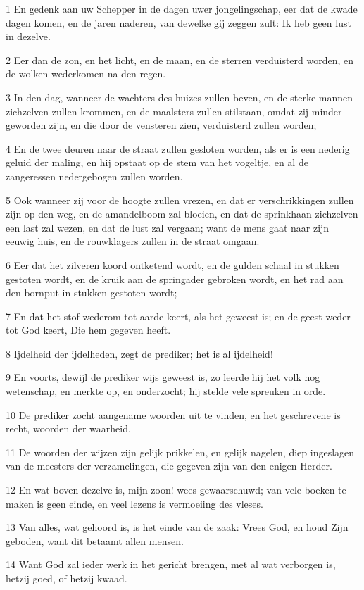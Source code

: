 \par 1 En gedenk aan uw Schepper in de dagen uwer jongelingschap, eer dat de kwade dagen komen, en de jaren naderen, van dewelke gij zeggen zult: Ik heb geen lust in dezelve.
\par 2 Eer dan de zon, en het licht, en de maan, en de sterren verduisterd worden, en de wolken wederkomen na den regen.
\par 3 In den dag, wanneer de wachters des huizes zullen beven, en de sterke mannen zichzelven zullen krommen, en de maalsters zullen stilstaan, omdat zij minder geworden zijn, en die door de vensteren zien, verduisterd zullen worden;
\par 4 En de twee deuren naar de straat zullen gesloten worden, als er is een nederig geluid der maling, en hij opstaat op de stem van het vogeltje, en al de zangeressen nedergebogen zullen worden.
\par 5 Ook wanneer zij voor de hoogte zullen vrezen, en dat er verschrikkingen zullen zijn op den weg, en de amandelboom zal bloeien, en dat de sprinkhaan zichzelven een last zal wezen, en dat de lust zal vergaan; want de mens gaat naar zijn eeuwig huis, en de rouwklagers zullen in de straat omgaan.
\par 6 Eer dat het zilveren koord ontketend wordt, en de gulden schaal in stukken gestoten wordt, en de kruik aan de springader gebroken wordt, en het rad aan den bornput in stukken gestoten wordt;
\par 7 En dat het stof wederom tot aarde keert, als het geweest is; en de geest weder tot God keert, Die hem gegeven heeft.
\par 8 Ijdelheid der ijdelheden, zegt de prediker; het is al ijdelheid!
\par 9 En voorts, dewijl de prediker wijs geweest is, zo leerde hij het volk nog wetenschap, en merkte op, en onderzocht; hij stelde vele spreuken in orde.
\par 10 De prediker zocht aangename woorden uit te vinden, en het geschrevene is recht, woorden der waarheid.
\par 11 De woorden der wijzen zijn gelijk prikkelen, en gelijk nagelen, diep ingeslagen van de meesters der verzamelingen, die gegeven zijn van den enigen Herder.
\par 12 En wat boven dezelve is, mijn zoon! wees gewaarschuwd; van vele boeken te maken is geen einde, en veel lezens is vermoeiing des vleses.
\par 13 Van alles, wat gehoord is, is het einde van de zaak: Vrees God, en houd Zijn geboden, want dit betaamt allen mensen.
\par 14 Want God zal ieder werk in het gericht brengen, met al wat verborgen is, hetzij goed, of hetzij kwaad.



